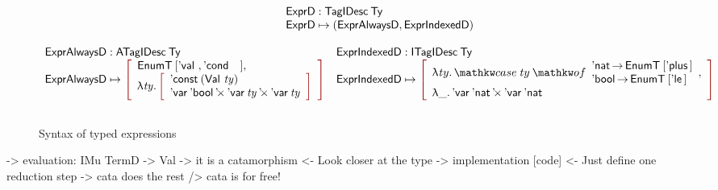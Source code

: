 \begin{figure*}

\[\stkc{
\stk{
\HExprD : \TagIDesc{\Ty} \\
\HExprD \mapsto ( \HExprAD , \HExprID ) \\
} \\
\\
\begin{array}{ll}
\stk{
\HExprAD : \ATagIDesc{\Ty} \\
\HExprAD \mapsto \bigRedBracket{
                 \begin{array}{l}
                   \EnumT{[\Eval{}, \Econd{}{}{}]} \red{,} \\
                   \LAM{\V{ty}}
                   \bigRedBracket{
                   \begin{array}{l}
                   \DConst{(\Val{\V{ty}})} \\
                   \DProd{\DVar{\Ebool}}{\DProd{\DVar{\V{ty}}}{\DVar{\V{ty}}}}
                   \end{array}
                   }
                 \end{array}
                 }
\\
\\
} &
\stk{
\HExprID : \ITagIDesc{\Ty} \\
\HExprID \mapsto \bigRedBracket{
                 \begin{array}{l}
                   \LAM{\V{t}y} \case{\V{t}y}{\Enat \To \EnumT{[\Eplus{\!}{\!}\!]} \\ \Ebool \To \EnumT{[\Ele{\!}{\!}\!]}} \red{,} \\
                   \LAM{\_} \DProd{\DVar{\Enat}}{\DVar{\Enat}} 
                   \end{array}
                   }
}
\end{array}
}\]

\caption{Syntax of typed expressions}
\label{fig:hexpr-full}

\end{figure*}

\begin{wstructure}
    -> evaluation: IMu TermD -> Val
        -> it is a catamorphism
            <- Look closer at the type
        -> implementation [code]
            <- Just define one reduction step
            -> cata does the rest
                /> cata is for free!
\end{wstructure}

\newcommand{\evalH}{\F{eval}_{\green{\Downarrow}}}
\newcommand{\evalOne}{\F{eval}_{\green{\downarrow}}}

